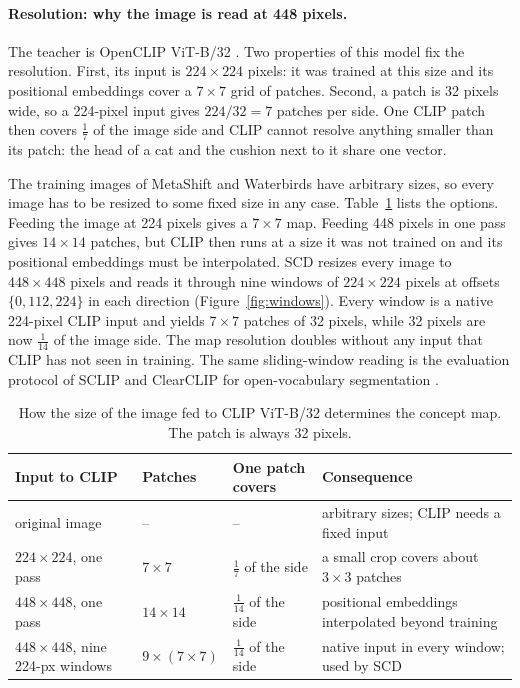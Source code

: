 \documentclass{article}
\begin{document}
\paragraph{Resolution: why the image is read at 448 pixels.}
The teacher is OpenCLIP ViT-B/32 \citep{radford2021clip}. Two properties of this model fix the resolution. First, its input is $224\times224$ pixels: it was trained at this size and its positional embeddings cover a $7\times7$ grid of patches. Second, a patch is 32 pixels wide, so a 224-pixel input gives $224/32=7$ patches per side. One CLIP patch then covers $\tfrac17$ of the image side and CLIP cannot resolve anything smaller than its patch: the head of a cat and the cushion next to it share one vector.

The training images of MetaShift and Waterbirds have arbitrary sizes, so every image has to be resized to some fixed size in any case. Table~\ref{tab:resolution} lists the options. Feeding the image at 224 pixels gives a $7\times7$ map. Feeding 448 pixels in one pass gives $14\times14$ patches, but CLIP then runs at a size it was not trained on and its positional embeddings must be interpolated. SCD resizes every image to $448\times448$ pixels and reads it through nine windows of $224\times224$ pixels at offsets $\{0,112,224\}$ in each direction (Figure~\ref{fig:windows}). Every window is a native 224-pixel CLIP input and yields $7\times7$ patches of 32 pixels, while 32 pixels are now $\tfrac{1}{14}$ of the image side. The map resolution doubles without any input that CLIP has not seen in training. The same sliding-window reading is the evaluation protocol of SCLIP and ClearCLIP for open-vocabulary segmentation \citep{wang2024sclip,lan2024clearclip}.

\begin{table}[htbp]
\centering\small
\caption{How the size of the image fed to CLIP ViT-B/32 determines the concept map. The patch is always 32 pixels.}
\label{tab:resolution}
\begin{tabularx}{\linewidth}{lllX}
\toprule
Input to CLIP & Patches & One patch covers & Consequence \\
\midrule
original image & -- & -- & arbitrary sizes; CLIP needs a fixed input \\
$224\times224$, one pass & $7\times7$ & $\tfrac17$ of the side & a small crop covers about $3\times3$ patches \\
$448\times448$, one pass & $14\times14$ & $\tfrac1{14}$ of the side & positional embeddings interpolated beyond training \\
$448\times448$, nine 224-px windows & $9\times(7\times7)$ & $\tfrac1{14}$ of the side & native input in every window; used by SCD \\
\bottomrule
\end{tabularx}
\end{table}
\end{document}

